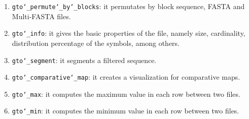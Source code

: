\begin{enumerate}
\item \texttt{gto\char`_permute\char`_by\char`_blocks}: it permutates by block sequence, FASTA and Multi-FASTA files. 

\item \texttt{gto\char`_info}: it gives the basic properties of the file, namely size, cardinality, distribution percentage of the symbols, among others.

\item \texttt{gto\char`_segment}: it segments a filtered sequence.

\item \texttt{gto\char`_comparative\char`_map}: it creates a visualization for comparative maps.

\item \texttt{gto\char`_max}: it computes the maximum value in each row between two files.

\item \texttt{gto\char`_min}: it computes the minimum value in each row between two files.

\end{enumerate}


















